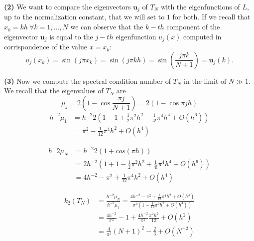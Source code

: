 \documentclass[a4paper,11pt]{article}
\begin{document}
\noindent \textbf{(2)} We want to compare the eigenvectors $\textbf{u}_j$ of $T_N$ with the eigenfunctions of $L$, up to the normalization constant, that we will set to $1$ for both. If we recall that $x_k = k h\ \forall k = 1,\dots, N$ we can observe that the $k-th$ component of the eigenvector $\textbf{u}_j$ is equal to the $j-th$ eigenfunction $u_j(x)$ computed in corrispondence of the value $x=x_k$:
\begin{equation}
	u_j(x_k) = \sin(j \pi x_k) = \sin ( j \pi k h ) = \sin\left( \frac{j \pi k}{N+1}\right)  = \textbf{u}_j(k).
\end{equation}

\noindent \textbf{(3)}  Now we compute the spectral condition number of $T_N$ in the limit of $N\gg 1$. We recall that the eigenvalues of $T_N$ are
\begin{equation}\label{key}
	\mu_j = 2\left( 1-\cos \frac{\pi j}{N+1}\right) = 2\left( 1-\cos \pi j h\right)
\end{equation}
\begin{equation}
	\begin{split}
		h^{-2}\mu_1 &= h^{-2} 2 \left(  1-1 +\frac{1}{2} \pi^2 h^2 - \frac{1}{4!} \pi^4 h^4 + O(h^6)\right) \\
		& = \pi^2 -\frac{1}{12} \pi^4 h^2 + O(h^4)
	\end{split}
\end{equation}

\begin{equation}
	\begin{split}
		h^-2\mu_N &= h^{-2}2(1+cos(\pi h))\\
		&=2h^{-2} \left( 1 + 1 -\frac{1}{2} \pi^2 h^2 + \frac{1}{4!} \pi^4 h^4 + O(h^6)\right) \\
		&= 4 h^{-2} - \pi^2 +\frac{1}{12} \pi^4 h^2 + O(h^4)
	\end{split}
\end{equation}

\begin{equation}
	\begin{split}
		k_2(T_N) &= \frac{h^{-2}\mu_N}{h^{-2}\mu_1} = \frac{4 h^{-2} - \pi^2 +\frac{1}{12} \pi^4 h^2 + O(h^4)}{\pi^2(1 -\frac{1}{12} \pi^2 h^2 + O(h^4))}\\
		&= \frac{4 h^{-2}}{\pi^2} -1 + \frac{4 h^{-2}}{\pi^2} \frac{\pi^2 h^2}{12} +O(h^2)\\
		&=\frac{4}{\pi^2}(N+1)^2 - \frac{2}{3} + O(N^{-2})
	\end{split}
\end{equation}
\end{document}
